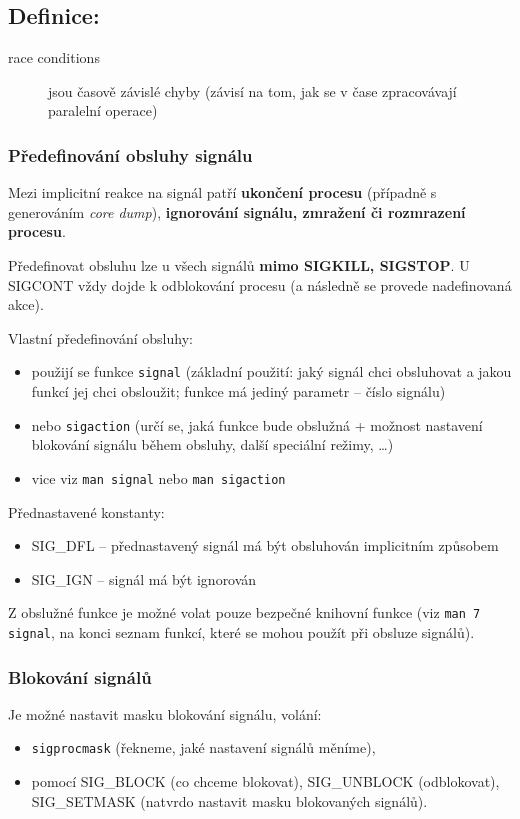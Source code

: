 \documentclass[a4paper, 11pt]{article}
\newcommand{\tcmd}[1]{\texttt{#1}}
\begin{document}
\subsection*{Definice:}
\begin{description}
\item[race conditions] jsou časově závislé chyby (závisí na tom, jak se v čase zpracovávají paralelní operace)
\end{description}

\subsubsection{Předefinování obsluhy signálu}
Mezi implicitní reakce na signál patří \textbf{ukončení procesu} (případně s generováním \emph{core dump}), \textbf{ignorování signálu, zmražení či rozmrazení procesu}. 
 
Předefinovat obsluhu lze u všech signálů \textbf{mimo SIGKILL, SIGSTOP}. U SIGCONT vždy dojde k odblokování procesu (a následně se provede nadefinovaná akce).
 
Vlastní předefinování obsluhy:
\begin{itemize}
    \item použijí se funkce \tcmd{signal} (základní použití: jaký signál chci obsluhovat a jakou funkcí jej chci obsloužit; funkce má jediný parametr -- číslo signálu)
    \item nebo \tcmd{sigaction} (určí se, jaká funkce bude obslužná + možnost nastavení blokování signálu během obsluhy, další speciální režimy, \ldots) 
    \item vice viz \tcmd{man signal} nebo \tcmd{man sigaction}
\end{itemize}
 
Přednastavené konstanty:
\begin{itemize}
    \item SIG\_DFL -- přednastavený signál má být obsluhován implicitním způsobem
    \item SIG\_IGN -- signál má být ignorován
\end{itemize}
 
Z obslužné funkce je možné volat pouze bezpečné knihovní funkce (viz \tcmd{man 7 signal}, na konci seznam funkcí, které se mohou použít při obsluze signálů).
 
\subsubsection{Blokování signálů}
Je možné nastavit masku blokování signálu, volání:
\begin{itemize}
    \item \tcmd{sigprocmask} (řekneme, jaké nastavení signálů měníme),
    \item pomocí SIG\_BLOCK (co chceme blokovat), SIG\_UNBLOCK (odblokovat), SIG\_SETMASK (natvrdo nastavit masku blokovaných signálů).
\end{itemize}
 
\end{document}
